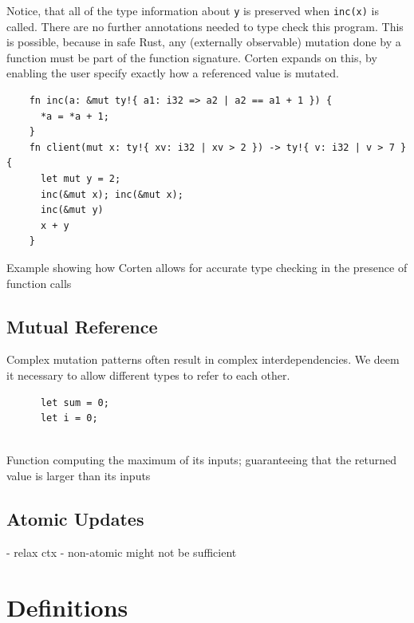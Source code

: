 \documentclass{book}
\newcommand{\code}[1]{\texttt{#1}}
\theoremstyle{definition}
\begin{document}
Notice, that all of the type information about \code{y} is preserved when \code{inc(x)} is called. There are no further annotations needed to type check this program. This is possible, because in safe Rust, any (externally observable) mutation done by a function must be part of the function signature. Corten expands on this, by enabling the user specify exactly how a referenced value is mutated.

\begin{listing}[h]
  \begin{verbatim}
    fn inc(a: &mut ty!{ a1: i32 => a2 | a2 == a1 + 1 }) {
      *a = *a + 1;
    }
    fn client(mut x: ty!{ xv: i32 | xv > 2 }) -> ty!{ v: i32 | v > 7 } {
      let mut y = 2;
      inc(&mut x); inc(&mut x);
      inc(&mut y)
      x + y
    }
  \end{verbatim}
  \caption{Example showing how Corten allows for accurate type checking in the presence of function calls }
  \label{lst:modular-calls}
\end{listing}



\label{subsec:mutual-reference}\subsection{Mutual Reference}

Complex mutation patterns often result in complex interdependencies. We deem it necessary to allow different types to refer to each other.

\begin{listing}[h]
  \begin{verbatim}
      let sum = 0;
      let i = 0;
      
  \end{verbatim}
  \caption{Function computing the maximum of its inputs; guaranteeing that the returned value is larger than its inputs}
  \label{lst:mutual-reference}
\end{listing}

\label{subsec:atomic-updates}\subsection{Atomic Updates}

- relax ctx
- non-atomic might not be sufficient


\section{Definitions}
\end{document}
